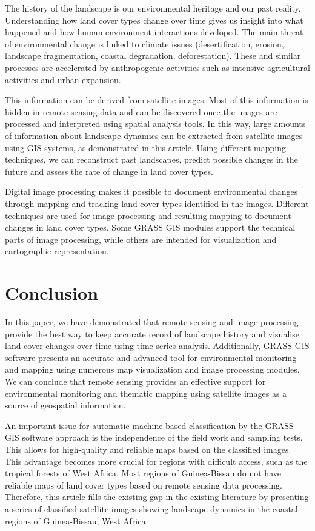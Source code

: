 \documentclass[final,5p,times,twocolumn]{elsarticle}
\begin{document}
The history of the landscape is our environmental heritage and our past reality. Understanding how land cover types change over time gives us insight into what happened and how human-environment interactions developed. The main threat of environmental change is linked to climate issues (desertification, erosion, landscape fragmentation, coastal degradation, deforestation). These and similar processes are accelerated by anthropogenic activities such as intensive agricultural activities and urban expansion.

This information can be derived from satellite images. Most of this information is hidden in remote sensing data and can be discovered once the images are processed and interpreted using spatial analysis tools. In this way, large amounts of information about landscape dynamics can be extracted from satellite images using GIS systems, as demonstrated in this article. Using different mapping techniques, we can reconstruct past landscapes, predict possible changes in the future and assess the rate of change in land cover types.

Digital image processing makes it possible to document environmental changes through mapping and tracking land cover types identified in the images. Different techniques are used for image processing and resulting mapping to document changes in land cover types. Some GRASS GIS modules support the technical parts of image processing, while others are intended for visualization and cartographic representation.

\section{Conclusion}

In this paper, we have demonstrated that remote sensing and image processing provide the best way to keep  accurate record of landscape history and visualise land cover changes over time using time series analysis. Additionally, GRASS GIS software presents an accurate and advanced tool for environmental monitoring and mapping using numerous map visualization and image processing modules. We can conclude that remote sensing provides an effective support for environmental monitoring and thematic mapping using satellite images as a source of geospatial information.

An important issue for automatic machine-based classification by the GRASS GIS software approach is the independence of the field work and sampling tests. This allows for high-quality and reliable maps based on the classified images. This advantage becomes more crucial for regions with difficult access, such as the tropical forests of West Africa. Most regions of Guinea-Bissau do not have reliable maps of land cover types based on remote sensing data processing. Therefore, this article fills the existing gap in the existing literature by presenting a series of classified satellite images showing landscape dynamics in the coastal regions of Guinea-Bissau, West Africa.
\end{document}
